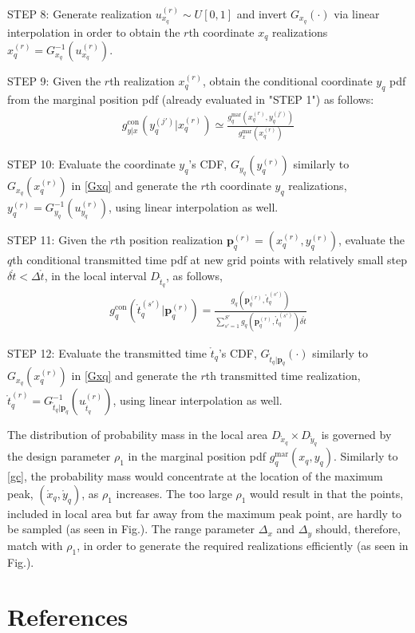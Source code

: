 \documentclass[review]{elsarticle}
\begin{document}
STEP 8: Generate realization $u_{x_q}^{(r)}\sim U[0,1]$ and invert $G_{x_q}(\cdot)$ via linear interpolation in order to obtain the $r$th coordinate $x_q$ realizations $x_q^{(r)}=G_{x_q}^{-1}(u_{x_q}^{(r)})$.

STEP 9: Given the $r$th realization $x_q^{(r)}$, obtain the conditional coordinate $y_q$ pdf from the marginal position pdf (already evaluated in "STEP 1") as follows:
\begin{align}
    g_{y\vert x}^{\text{con}}(y_q^{(j')}\vert x_q^{(r)})\simeq \frac{g_{q}^{\text{mar}}(x_q^{(r)},y_q^{(j')})}{g_{x}^{\text{mar}}(x_q^{(r)})}
\end{align}

STEP 10: Evaluate the coordinate $y_q$'s CDF, $G_{y_q}(y_q^{(r)})$ similarly to $G_{x_q}(x_q^{(r)})$ in \eqref{Gxq} and generate the $r$th coordinate $y_q$ realizations, $y_q^{(r)}=G_{y_q}^{-1}(u_{y_q}^{(r)})$, using linear interpolation as well.

STEP 11: Given the $r$th position realization $\boldsymbol{p}_q^{(r)}=(x_q^{(r)},y_q^{(r)})$, evaluate the $q$th conditional transmitted time pdf at new grid points with relatively small step $\delta \mathring{t}<\Delta \mathring{t}$, in the local interval $D_{\mathring{t}_q}$, as follows,
\begin{align}
    g_{q}^{\text{con}}(\mathring{t}_q^{(s')} \vert \boldsymbol{p}_q^{(r)})=\frac{g_q(\boldsymbol{p}_q^{(r)},\mathring{t}_q^{(s')})}{\sum_{s'=1}^{S'} g_q(\boldsymbol{p}_q^{(r)},\mathring{t}_q^{(s')})\delta\mathring{t}}
\end{align}

STEP 12: Evaluate the transmitted time $\mathring{t}_q$'s CDF, $G_{\mathring{t}_q\vert \boldsymbol{p}_q}(\cdot)$ similarly to $G_{x_q}(x_q^{(r)})$ in \eqref{Gxq} and generate the $r$th transmitted time realization, $\mathring{t}_q^{(r)}=G^{-1}_{\mathring{t}_q\vert \boldsymbol{p}_q}(u_{\mathring{t}_q}^{(r)})$, using linear interpolation as well.

The distribution of probability mass in the local area $D_{\mathring{x}_q}\times D_{\mathring{y}_q}$ is governed by the design parameter $\rho_1$ in the marginal position pdf $g_{q}^{\text{mar}}(x_q,y_q)$. Similarly to \eqref{gc}, the probability mass would concentrate at the location of the maximum peak, $(\mathring{x}_q,\mathring{y}_q)$, as $\rho_1$ increases. The too large $\rho_1$ would result in that the points, included in local area but far away from the maximum peak point, are hardly to be sampled (as seen in Fig.). The range parameter $\Delta_x$ and $\Delta_y$ should, therefore, match with $\rho_1$, in order to generate the required realizations efficiently (as seen in Fig.).

\section*{References}

\end{document}
